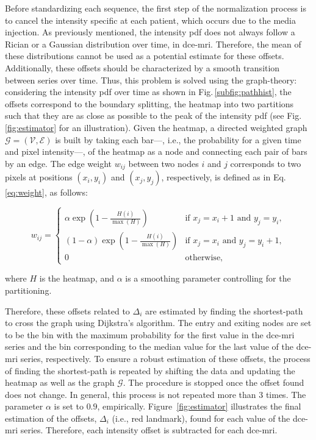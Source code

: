 Before standardizing each sequence, the first step of the
normalization process is to cancel the intensity specific at each
patient, which occurs due to the media injection.
As previously mentioned, the intensity \ac{pdf} does not always follow a Rician or a Gaussian distribution over time, in \ac{dce}-\ac{mri}.
Therefore, the mean of these distributions cannot be used as a potential estimate for these offsets.
Additionally, these offsets should be characterized by a smooth transition between series over time.
Thus, this problem is solved using the graph-theory: considering the intensity \ac{pdf} over time as shown in Fig.\,\ref{subfig:pathhist}, the offsets correspond to the boundary splitting, the heatmap into two partitions such that they are as close as possible to the peak of the intensity \ac{pdf} (see Fig.\,\ref{fig:estimator} for an illustration).
Given the heatmap, a directed weighted graph
$\mathcal{G}=(\mathcal{V}, \mathcal{E})$ is built by taking each
bar---, i.e., the probability for a given time and pixel intensity---,
of the heatmap as a node and connecting each pair of bars by an edge.
The edge weight $w_{ij}$ between two nodes $i$ and $j$ corresponds to
two pixels at positions $(x_i, y_i)$ and $(x_j, y_j)$, respectively,
is defined as in Eq.\,\eqref{eq:weight}, as follows:

\begin{equation}
  w_{ij} = \begin{cases}
    \alpha \exp(1 - \frac{H(i)}{\max(H)})       & \text{if } x_j = x_i + 1 \text{ and } y_j = y_i, \\
    (1 - \alpha) \exp(1 - \frac{H(i)}{\max(H)}) & \text{if } x_j = x_i \text{ and } y_j = y_i + 1, \\
    0                                           & \text{otherwise},
  \end{cases}
  \label{eq:weight}
\end{equation}

\noindent where $H$ is the heatmap, and $\alpha$ is a smoothing
parameter controlling for the partitioning.

Therefore, these offsets related to $\Delta_i$ are estimated by finding the shortest-path to cross the graph using Dijkstra's algorithm.
The entry and exiting nodes are set to be the bin with the maximum
probability for the first value in the \ac{dce}-\ac{mri} series and
the bin corresponding to the median value for the last value of the \ac{dce}-\ac{mri} series, respectively.
To ensure a robust estimation of these offsets, the process of finding the shortest-path is repeated by shifting the data and updating the heatmap as well as the graph $\mathcal{G}$.
The procedure is stopped once the offset found does not change.
In general, this process is not repeated more than 3 times.
The parameter $\alpha$ is set to $0.9$, empirically.
Figure~\ref{fig:estimator} illustrates the final estimation of the
offsets, $\Delta_i$ (i.e., red landmark), found for each value of the \ac{dce}-\ac{mri} series.
Therefore, each intensity offset is subtracted for each \ac{dce}-\ac{mri}.

